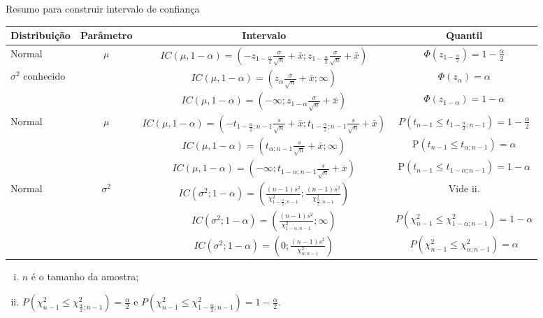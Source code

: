 \documentclass[8pt]{beamer}
\begin{document}
\begin{frame}{Resumo para construir intervalo de confiança}

{\tiny%

\begin{table}[htbp]
	\centering
	\begin{tabular}{l|c|c|c}
		\toprule[0.05cm]
		Distribuição & Parâmetro & Intervalo  & Quantil \\ \midrule[0.05cm]
		Normal  & $\mu$ & $  IC(\mu, 1-\alpha) = \left(-z_{1-\frac{\alpha}{2}} \frac{\sigma}{\sqrt{n}} + \bar{x}; z_{1-\frac{\alpha}{2}} \frac{\sigma}{\sqrt{n}} + \bar{x} \right)$  & $\Phi\left(z_{1-\frac{\alpha}{2}}\right) = 1 - \frac{\alpha}{2}$ \\ 
		 $\sigma^2$ conhecido &  & $IC(\mu, 1-\alpha) = \left(z_{\alpha} \frac{\sigma}{\sqrt{n}} + \bar{x} ;\infty \right)$  & $\Phi\left(z_\alpha\right) = \alpha$ \\ 
		&  & $IC(\mu, 1-\alpha) = \left(-\infty; z_{1-\alpha}  \frac{\sigma}{\sqrt{n}} + \bar{x}\right)$  & $\Phi\left( z_{1-\alpha} \right) = 1 - \alpha$ \\ \midrule
		Normal  & $\mu$ & $IC(\mu, 1-\alpha) = \left( -t_{1-\frac{\alpha}{2}; n-1} \frac{s}{\sqrt{n}} + \bar{x}; t_{1-\frac{\alpha}{2}; n-1} \frac{s}{\sqrt{n}} + \bar{x} \right)$  & $P\left(t_{n-1} \leq t_{1-\frac{\alpha}{2}; n-1}\right) = 1 - \frac{\alpha}{2}$ \\ 
		&  & $IC(\mu, 1-\alpha) = \left( t_{\alpha; n-1} \frac{s}{\sqrt{n}} + \bar{x}; \infty \right)$  & P$\left(t_{n-1} \leq t_{\alpha; n-1}\right) =  \alpha$ \\ 
		&  & $IC(\mu, 1-\alpha) = \left( -\infty; t_{1-\alpha; n-1} \frac{s}{\sqrt{n}} + \bar{x}\right)$  & P$\left(t_{n-1} \leq t_{1-\alpha; n-1}\right) = 1- \alpha$ \\ \midrule
		Normal & $\sigma^2$ & $IC(\sigma^2; 1-\alpha) = \left( \frac{(n-1)s^2}{\chi^2_{1-\frac{\alpha}{2}; n-1}}; \frac{(n-1)s^2}{\chi^2_{\frac{\alpha}{2}; n-1}}  \right)$  & Vide ii. \\ 
		 &  & $IC(\sigma^2; 1-\alpha) = \left(\frac{(n-1)s^2}{\chi^2_{1-\alpha; n-1}}; \infty  \right)$  & $P\left( \chi^2_{n-1} \leq \chi^2_{1-\alpha; n-1} \right) = 1-\alpha$ \\ 
		 &  & $IC(\sigma^2; 1-\alpha) = \left(0; \frac{(n-1)s^2}{\chi^2_{\alpha; n-1}} \right)$  & $P\left( \chi^2_{n-1} \leq \chi^2_{\alpha; n-1} \right) = \alpha$ \\ \bottomrule[0.05cm]
	\end{tabular}
\end{table}
\begin{enumerate}[i.]
	\item $n$ é o tamanho da amostra;
	\item $P\left( \chi^2_{n-1} \leq \chi^2_{\frac{\alpha}{2};n-1} \right) = \frac{\alpha}{2}$ e $P\left( \chi^2_{n-1} \leq \chi^2_{1-\frac{\alpha}{2};n-1} \right) = 1- \frac{\alpha}{2}$.
\end{enumerate}
}


\end{frame}
\end{document}
